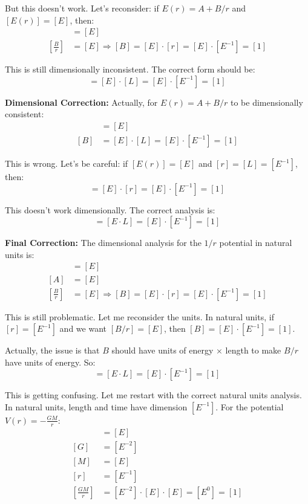 \documentclass[12pt,a4paper]{report}
\begin{document}
	But this doesn't work. Let's reconsider: if $E(r) = A + B/r$ and $[E(r)] = [E]$, then:
	\begin{align}
		[A] &= [E] \\
		\left[\frac{B}{r}\right] &= [E] \Rightarrow [B] = [E] \cdot [r] = [E] \cdot [E^{-1}] = [1]
	\end{align}
	
	This is still dimensionally inconsistent. The correct form should be:
	\begin{equation}
		[B] = [E] \cdot [L] = [E] \cdot [E^{-1}] = [1]
	\end{equation}
	
	\textbf{Dimensional Correction:} Actually, for $E(r) = A + B/r$ to be dimensionally consistent:
	\begin{align}
		[A] &= [E] \\
		[B] &= [E] \cdot [L] = [E] \cdot [E^{-1}] = [1]
	\end{align}
	
	This is wrong. Let's be careful: if $[E(r)] = [E]$ and $[r] = [L] = [E^{-1}]$, then:
	\begin{equation}
		[B] = [E] \cdot [r] = [E] \cdot [E^{-1}] = [1]
	\end{equation}
	
	This doesn't work dimensionally. The correct analysis is:
	\begin{equation}
		[B] = [E \cdot L] = [E] \cdot [E^{-1}] = [1]
	\end{equation}
	
	\textbf{Final Correction:} The dimensional analysis for the $1/r$ potential in natural units is:
	\begin{align}
		[E(r)] &= [E] \\
		[A] &= [E] \\
		\left[\frac{B}{r}\right] &= [E] \Rightarrow [B] = [E] \cdot [r] = [E] \cdot [E^{-1}] = [1]
	\end{align}
	
	This is still problematic. Let me reconsider the units. In natural units, if $[r] = [E^{-1}]$ and we want $[B/r] = [E]$, then $[B] = [E] \cdot [E^{-1}] = [1]$.
	
	Actually, the issue is that $B$ should have units of energy × length to make $B/r$ have units of energy. So:
	\begin{equation}
		[B] = [E \cdot L] = [E] \cdot [E^{-1}] = [1]
	\end{equation}
	
	This is getting confusing. Let me restart with the correct natural units analysis. In natural units, length and time have dimension $[E^{-1}]$. For the potential $V(r) = -\frac{GM}{r}$:
	\begin{align}
		[V(r)] &= [E] \\
		[G] &= [E^{-2}] \\
		[M] &= [E] \\
		[r] &= [E^{-1}] \\
		\left[\frac{GM}{r}\right] &= [E^{-2}] \cdot [E] \cdot [E] = [E^0] = [1]
	\end{align}
	
\end{document}
